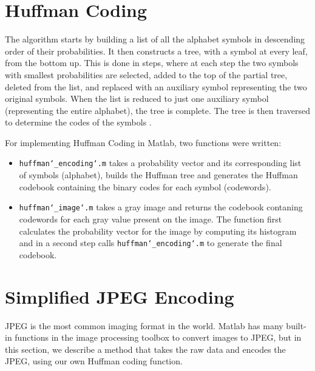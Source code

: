 \documentclass[11pt,a4paper,table]{article}
\begin{document}
\section{Huffman Coding}
The algorithm starts by building a list of all the alphabet symbols in descending order of their probabilities. It then constructs a tree, with a symbol at every leaf, from the bottom up. This is done in steps, where at each step the two symbols with smallest probabilities are selected, added to the top of the partial tree, deleted from the list, and replaced with an auxiliary symbol representing the two original symbols. When the list is reduced to just one auxiliary symbol (representing the entire alphabet), the tree is complete. The tree is then traversed to determine the codes of the symbols  \cite{Salomon2007}.

For implementing Huffman Coding in Matlab, two functions were written: 
\begin{itemize}
\item \texttt{huffman\char`_encoding\char`.m} takes a probability vector and its corresponding list of symbols (alphabet), builds the Huffman tree and generates the Huffman codebook containing the binary codes for each symbol (codewords).
\item \texttt{huffman\char`_image\char`.m}  takes a gray image and returns the codebook contaning codewords for each gray value present on the image. The function first calculates the probability vector for the image by computing its histogram and in a second step calls \texttt{huffman\char`_encoding\char`.m} to generate the final codebook. 
\end{itemize}

\section{Simplified JPEG Encoding}
JPEG is the most common imaging format in the world. Matlab has many built-in functions in the image processing toolbox to convert images to JPEG, but in this section, we describe a method that takes the raw data and encodes the JPEG, using our own Huffman coding function.
\end{document}
